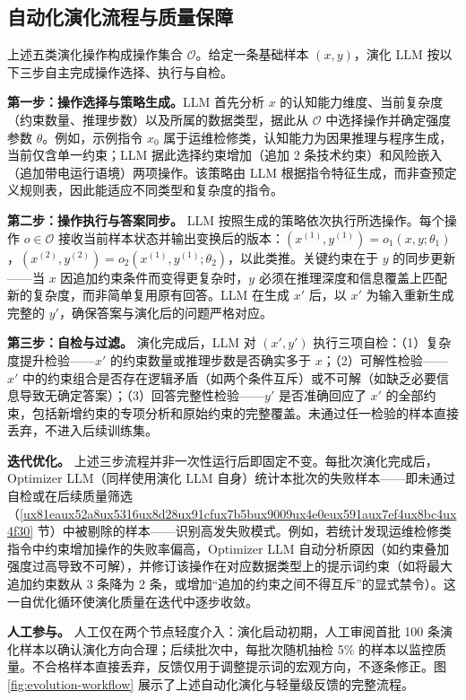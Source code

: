 \documentclass[fontset=fandol,type=master,campus=shenzhen,etitleauto=true]{hithesisbook}
\begin{document}
\subsection{自动化演化流程与质量保障}\label{ux4ebaux673aux534fux540cux5ba1ux6838ux673aux5236}

上述五类演化操作构成操作集合 $\mathcal{O}$。给定一条基础样本 $(x, y)$，演化 LLM 按以下三步自主完成操作选择、执行与自检。

\textbf{第一步：操作选择与策略生成。}LLM 首先分析 $x$ 的认知能力维度、当前复杂度（约束数量、推理步数）以及所属的数据类型，据此从 $\mathcal{O}$ 中选择操作并确定强度参数 $\theta$。例如，示例指令 $x_0$ 属于运维检修类，认知能力为因果推理与程序生成，当前仅含单一约束；LLM 据此选择约束增加（追加 2 条技术约束）和风险嵌入（追加带电运行语境）两项操作。该策略由 LLM 根据指令特征生成，而非查预定义规则表，因此能适应不同类型和复杂度的指令。

\textbf{第二步：操作执行与答案同步。} LLM 按照生成的策略依次执行所选操作。每个操作 $o \in \mathcal{O}$ 接收当前样本状态并输出变换后的版本：$(x^{(1)}, y^{(1)}) = o_1(x, y; \theta_1)$，$(x^{(2)}, y^{(2)}) = o_2(x^{(1)}, y^{(1)}; \theta_2)$，以此类推。关键约束在于 $y$ 的同步更新------当 $x$ 因追加约束条件而变得更复杂时，$y$ 必须在推理深度和信息覆盖上匹配新的复杂度，而非简单复用原有回答。LLM 在生成 $x'$ 后，以 $x'$ 为输入重新生成完整的 $y'$，确保答案与演化后的问题严格对应。

\textbf{第三步：自检与过滤。} 演化完成后，LLM 对 $(x', y')$ 执行三项自检：（1）复杂度提升检验------$x'$ 的约束数量或推理步数是否确实多于 $x$；（2）可解性检验------$x'$ 中的约束组合是否存在逻辑矛盾（如两个条件互斥）或不可解（如缺乏必要信息导致无确定答案）；（3）回答完整性检验------$y'$ 是否准确回应了 $x'$ 的全部约束，包括新增约束的专项分析和原始约束的完整覆盖。未通过任一检验的样本直接丢弃，不进入后续训练集。

\textbf{迭代优化。} 上述三步流程并非一次性运行后即固定不变。每批次演化完成后，Optimizer LLM（同样使用演化 LLM 自身）统计本批次的失败样本------即未通过自检或在后续质量筛选（\ref{ux81eaux52a8ux5316ux8d28ux91cfux7b5bux9009ux4e0eux591aux7ef4ux8bc4ux4f30} 节）中被剔除的样本------识别高发失败模式。例如，若统计发现运维检修类指令中约束增加操作的失败率偏高，Optimizer LLM 自动分析原因（如约束叠加强度过高导致不可解），并修订该操作在对应数据类型上的提示词约束（如将最大追加约束数从 3 条降为 2 条，或增加``追加的约束之间不得互斥''的显式禁令）。这一自优化循环使演化质量在迭代中逐步收敛。

\textbf{人工参与。} 人工仅在两个节点轻度介入：演化启动初期，人工审阅首批 100 条演化样本以确认演化方向合理；后续批次中，每批次随机抽检 5\% 的样本以监控质量。不合格样本直接丢弃，反馈仅用于调整提示词的宏观方向，不逐条修正。图 \ref{fig:evolution-workflow} 展示了上述自动化演化与轻量级反馈的完整流程。
\end{document}

